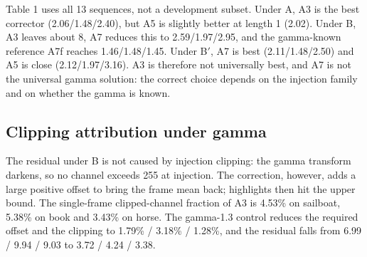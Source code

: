 \documentclass[twocolumn,10pt]{svjour3}
\begin{document}
\begin{table}[t]
\centering
\caption{Interval Y-MAE over all 13 sequences (lower is better; mean of 13). The full 10-method matrix is in Supplementary Table S1.}
\end{table}

Table 1 uses all 13 sequences, not a development subset. Under A, A3 is the best corrector (2.06/1.48/2.40), but A5 is slightly better at length 1 (2.02). Under B, A3 leaves about 8, A7 reduces this to 2.59/1.97/2.95, and the gamma-known reference A7f reaches 1.46/1.48/1.45. Under B$'$, A7 is best (2.11/1.48/2.50) and A5 is close (2.12/1.97/3.16). A3 is therefore not universally best, and A7 is not the universal gamma solution: the correct choice depends on the injection family and on whether the gamma is known.


\subsection{Clipping attribution under gamma}

The residual under B is not caused by injection clipping: the gamma transform darkens, so no channel exceeds 255 at injection. The correction, however, adds a large positive offset to bring the frame mean back; highlights then hit the upper bound. The single-frame clipped-channel fraction of A3 is 4.53\% on sailboat, 5.38\% on book and 3.43\% on horse. The gamma-1.3 control reduces the required offset and the clipping to 1.79\% / 3.18\% / 1.28\%, and the residual falls from 6.99 / 9.94 / 9.03 to 3.72 / 4.24 / 3.38.
\end{document}
